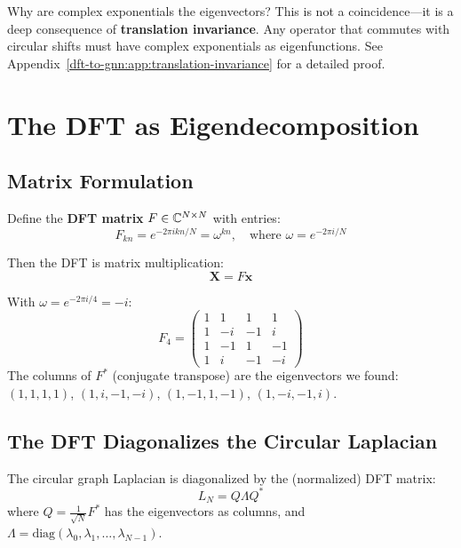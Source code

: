 \begin{notechapter}
\begin{remark}
Why are complex exponentials the eigenvectors? This is not a 
coincidence---it is a deep consequence of \textbf{translation 
invariance}. Any operator that commutes with circular shifts must 
have complex exponentials as eigenfunctions. See 
Appendix~\ref{dft-to-gnn:app:translation-invariance} for a detailed proof.
\end{remark}

\section{The DFT as Eigendecomposition}

\subsection{Matrix Formulation}

Define the \textbf{DFT matrix} $F \in \mathbb{C}^{N \times N}$ with entries:
\begin{equation}
F_{kn} = e^{-2\pi i kn/N} = \omega^{kn}, 
\quad \text{where } \omega = e^{-2\pi i/N}
\end{equation}

Then the DFT is matrix multiplication:
\begin{equation}
\mathbf{X} = F \mathbf{x}
\end{equation}

\begin{example}[DFT Matrix for $N = 4$]
With $\omega = e^{-2\pi i/4} = -i$:
\[
F_4 = \begin{pmatrix}
1 & 1 & 1 & 1 \\
1 & -i & -1 & i \\
1 & -1 & 1 & -1 \\
1 & i & -1 & -i
\end{pmatrix}
\]
The columns of $F^*$ (conjugate transpose) are the eigenvectors we 
found: $(1, 1, 1, 1)$, $(1, i, -1, -i)$, $(1, -1, 1, -1)$, 
$(1, -i, -1, i)$.
\end{example}

\subsection{The DFT Diagonalizes the Circular Laplacian}

\begin{theorem}[Diagonalization]
The circular graph Laplacian is diagonalized by the (normalized) DFT 
matrix:
\begin{equation}
L_N = Q \Lambda Q^*
\end{equation}
where $Q = \frac{1}{\sqrt{N}} F^*$ has the eigenvectors as columns, 
and $\Lambda = \text{diag}(\lambda_0, \lambda_1, \ldots, \lambda_{N-1})$.
\end{theorem}


\end{notechapter}
